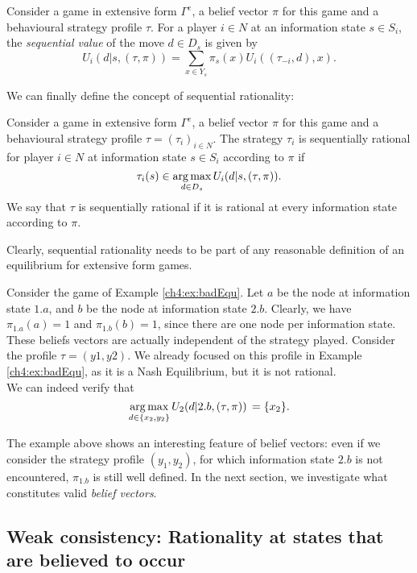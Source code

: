 \begin{definition}
Consider a game in extensive form $\Gamma^e$, a belief vector $\pi$ for this game and a behavioural strategy profile $\tau$.
For a player $i \in N$ at an information state $s \in S_i$, the \emph{sequential value} of the move $d \in D_s$ is given by
$$ U_i(d| s, (\tau, \pi) ) = \sum_{x \in Y_s} \pi_s(x) U_i((\tau_{-i}, d), x). $$
\end{definition}

We can finally define the concept of sequential rationality:
\begin{definition}
Consider a game in extensive form $\Gamma^e$, a belief vector $\pi$ for this game and a behavioural strategy profile $\tau = (\tau_i)_{i \in N}$. The strategy $\tau_i$ is sequentially rational for player $i \in N$ at information state $s \in S_i$ according to $\pi$ if
$$\tau_i(s) \in \operatorname*{arg\,max}_{d \in D_s}  U_i(d| s, ( \tau, \pi) ).$$
We say that $\tau$ is sequentially rational if it is rational at every information state according to $\pi$.
\end{definition}

Clearly, sequential rationality needs to be part of any reasonable definition of an equilibrium for extensive form games.
\begin{example}
\label{ch4:ex:seqRatio}
Consider the game of Example \ref{ch4:ex:badEqu}. Let $a$ be the node at information state $1.a$, and $b$ be the node at information state $2.b$.
Clearly, we have $\pi_{1.a}(a) = 1$ and $\pi_{1.b}(b) = 1$, since there are one node per information state. These beliefs vectors are actually independent of the strategy played.
Consider the profile $\tau = (y1, y2)$. We already focused on this profile in Example \ref{ch4:ex:badEqu}, as it is a Nash Equilibrium, but it is not rational. \\
We can indeed verify that
$$ \operatorname*{arg\,max}_{d \in \{x_2, y_2\}} U_2(d | 2.b, (\tau, \pi)) \, = \{x_2\}. $$
\end{example}

The example above shows an interesting feature of belief vectors: even if we consider the strategy profile $(y_1, y_2)$, for which information state $2.b$ is not encountered, $\pi_{1.b}$ is still well defined. In the next section, we investigate what constitutes valid \emph{belief vectors}.
\subsection{Weak consistency: Rationality at states that are believed to occur}


